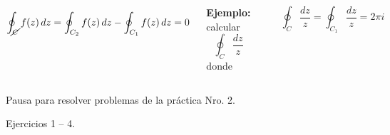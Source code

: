 \documentclass[9pt, aspectratio=169]{beamer}
\begin{document}
\begin{frame}
\begin{columns}[t]
 \cx
 \[\oint_{\cancel{C}} f(z) \, dz = \oint_{C_2} f(z) \, dz - \oint_{C_1} f(z) \, dz = 0 \]
 \pause

 \textbf{Ejemplo:} calcular
 \[ \oint_C \frac{dz}{z} \]
 donde
  \begin{center}
      \includegraphics[scale=0.40]{figs/fig-10.pdf}
  \end{center}

  \[ \oint_C \frac{dz}{z} = \oint_{C_1} \frac{dz}{z} = 2 \pi i \]

\end{columns}
\end{frame}

\begin{frame}[standout]
    \begin{center}
        Pausa para resolver problemas de la práctica Nro. 2.

        Ejercicios 1 -- 4. 
    \end{center}
\end{frame}
\end{document}
